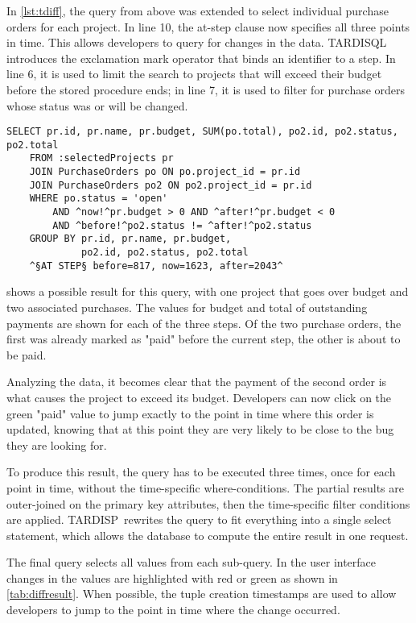 \documentclass[english]{sig-alternate-05-2015}
\newcommand{\tool}{TARDISP}
\newcommand{\SQLextension}{TARDISQL}
\begin{document}
In \cref{lst:tdiff}, the query from above was extended to select individual purchase orders for each project.
In line 10, the at-step clause now specifies all three points in time.
This allows developers to query for changes in the data.
\SQLextension\, introduces the exclamation mark operator that binds an identifier to a step.
In line 6, it is used to limit the search to projects that will exceed their budget before the stored procedure ends;
in line 7, it is used to filter for purchase orders whose status was or will be changed.

\begin{lstlisting}[language=HanaSQL,float=b,caption={Example of a time-diff query: "Select all projects that will go over budget and their respective purchase orders"},label=lst:tdiff]
	SELECT pr.id, pr.name, pr.budget, SUM(po.total), po2.id, po2.status, po2.total
	FROM :selectedProjects pr
	JOIN PurchaseOrders po ON po.project_id = pr.id
	JOIN PurchaseOrders po2 ON po2.project_id = pr.id
	WHERE po.status = 'open'
		AND ^now!^pr.budget > 0 AND ^after!^pr.budget < 0
		AND ^before!^po2.status != ^after!^po2.status
	GROUP BY pr.id, pr.name, pr.budget, 
	         po2.id, po2.status, po2.total
	^§AT STEP§ before=817, now=1623, after=2043^
\end{lstlisting}

 shows a possible result for this query, with one project that goes over budget and two associated purchases.
The values for budget and total of outstanding payments are shown for each of the three steps.
Of the two purchase orders, the first was already marked as "paid" before the current step, the other is about to be paid.

Analyzing the data, it becomes clear that the payment of the second order is what causes the project to exceed its budget.
Developers can now click on the green "paid" value to jump exactly to the point in time where this order is updated, knowing that at this point they are very likely to be close to the bug they are looking for.

To produce this result, the query has to be executed three times, once for each point in time, without the time-specific where-conditions.
The partial results are outer-joined on the primary key attributes, then the time-specific filter conditions are applied.
\tool\, rewrites the query to fit everything into a single select statement, which allows the database to compute the entire result in one request.

The final query selects all values from each sub-query.
In the user interface changes in the values are highlighted with red or green as shown in \cref{tab:diffresult}.
When possible, the tuple creation timestamps are used to allow developers to jump to the point in time where the change occurred.
\end{document}

